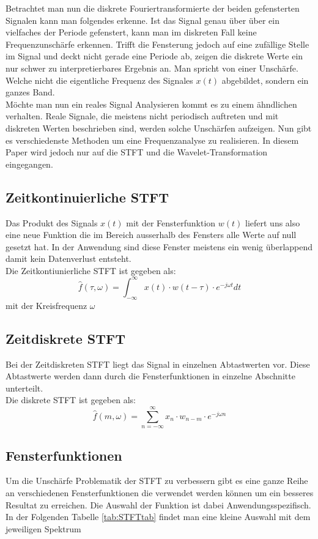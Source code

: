 Betrachtet man nun die diskrete Fouriertransformierte der beiden gefensterten Signalen kann man folgendes erkenne. Ist das Signal genau über über ein vielfaches der Periode gefenstert, kann man im diskreten Fall keine Frequenzunschärfe erkennen. Trifft die Fensterung jedoch auf eine zufällige Stelle im Signal und deckt nicht gerade eine Periode ab, zeigen die diskrete Werte ein nur schwer zu interpretierbares Ergebnis an. Man spricht von einer Unschärfe. Welche nicht die eigentliche Frequenz des Signales $x(t)$ abgebildet, sondern ein ganzes Band.\\
Möchte man nun ein reales Signal Analysieren kommt es zu einem ähndlichen verhalten. Reale Signale, die meistens nicht periodisch auftreten und mit diskreten Werten beschrieben sind, werden solche Unschärfen aufzeigen. Nun gibt es verschiedenste Methoden um eine Frequenzanalyse zu realisieren. In diesem Paper wird jedoch nur auf die STFT und die Wavelet-Transformation eingegangen. 


\subsection{Zeitkontinuierliche STFT}

Das Produkt des Signals $x(t)$ mit der Fensterfunktion $w(t) $ liefert uns also eine neue Funktion die im Bereich ausserhalb des Fensters alle Werte auf null gesetzt hat. In der Anwendung sind diese Fenster meistens ein wenig überlappend damit kein Datenverlust entsteht. \\
Die Zeitkontiunierliche STFT ist  gegeben als:
\begin{equation}
	\hat{f}(\tau, \omega)=\int_{-\infty}^{\infty} x(t)\cdot w(t-\tau)\cdot e^{-j \omega t} dt
\end{equation}
mit der Kreisfrequenz  $\omega $

\subsection{Zeitdiskrete STFT}
Bei der Zeitdiskreten STFT liegt das Signal in einzelnen Abtastwerten vor. Diese Abtastwerte werden dann durch die Fensterfunktionen in einzelne Abschnitte unterteilt. \\
Die diskrete STFT ist gegeben als:
\begin{equation}
	\hat{f}(m, \omega)=\sum_{n=-\infty}^{\infty} x_{n} \cdot w_{n-m}\cdot e^{-j \omega n}
\end{equation}


\subsection{Fensterfunktionen}
Um die Unschärfe Problematik der STFT zu verbessern gibt es eine ganze Reihe an verschiedenen Fensterfunktionen die verwendet werden können um ein besseres Resultat zu erreichen. Die Auswahl der Funktion ist dabei Anwendungsspezifisch. In der Folgenden Tabelle \ref{tab:STFTtab} findet man eine kleine Auswahl mit dem jeweiligen Spektrum 



